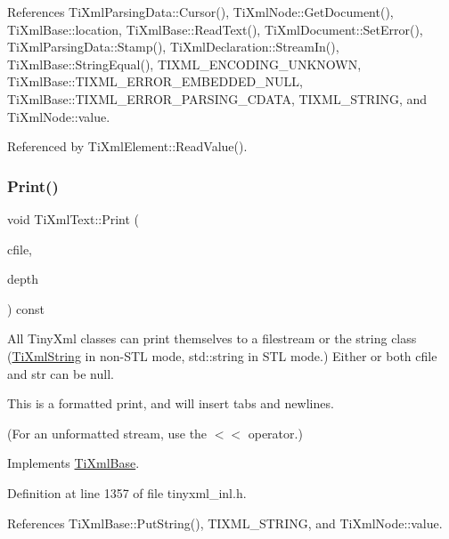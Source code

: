 References Ti\+Xml\+Parsing\+Data\+::\+Cursor(), Ti\+Xml\+Node\+::\+Get\+Document(), Ti\+Xml\+Base\+::location, Ti\+Xml\+Base\+::\+Read\+Text(), Ti\+Xml\+Document\+::\+Set\+Error(), Ti\+Xml\+Parsing\+Data\+::\+Stamp(), Ti\+Xml\+Declaration\+::\+Stream\+In(), Ti\+Xml\+Base\+::\+String\+Equal(), T\+I\+X\+M\+L\+\_\+\+E\+N\+C\+O\+D\+I\+N\+G\+\_\+\+U\+N\+K\+N\+O\+WN, Ti\+Xml\+Base\+::\+T\+I\+X\+M\+L\+\_\+\+E\+R\+R\+O\+R\+\_\+\+E\+M\+B\+E\+D\+D\+E\+D\+\_\+\+N\+U\+LL, Ti\+Xml\+Base\+::\+T\+I\+X\+M\+L\+\_\+\+E\+R\+R\+O\+R\+\_\+\+P\+A\+R\+S\+I\+N\+G\+\_\+\+C\+D\+A\+TA, T\+I\+X\+M\+L\+\_\+\+S\+T\+R\+I\+NG, and Ti\+Xml\+Node\+::value.



Referenced by Ti\+Xml\+Element\+::\+Read\+Value().

\hypertarget{class_ti_xml_text_a75f6895906333894e2574cc8cf77ea79}{}\label{class_ti_xml_text_a75f6895906333894e2574cc8cf77ea79} 
\subsubsection{\texorpdfstring{Print()}{Print()}}
{\footnotesize\ttfamily void Ti\+Xml\+Text\+::\+Print (\begin{DoxyParamCaption}\item[{F\+I\+LE $\ast$}]{cfile,  }\item[{int}]{depth }\end{DoxyParamCaption}) const\hspace{0.3cm}{\ttfamily [virtual]}}

All Tiny\+Xml classes can print themselves to a filestream or the string class (\hyperlink{class_ti_xml_string}{Ti\+Xml\+String} in non-\/\+S\+TL mode, std\+::string in S\+TL mode.) Either or both cfile and str can be null.

This is a formatted print, and will insert tabs and newlines.

(For an unformatted stream, use the $<$$<$ operator.) 

Implements \hyperlink{class_ti_xml_base_a0de56b3f2ef14c65091a3b916437b512}{Ti\+Xml\+Base}.



Definition at line 1357 of file tinyxml\+\_\+inl.\+h.



References Ti\+Xml\+Base\+::\+Put\+String(), T\+I\+X\+M\+L\+\_\+\+S\+T\+R\+I\+NG, and Ti\+Xml\+Node\+::value.

